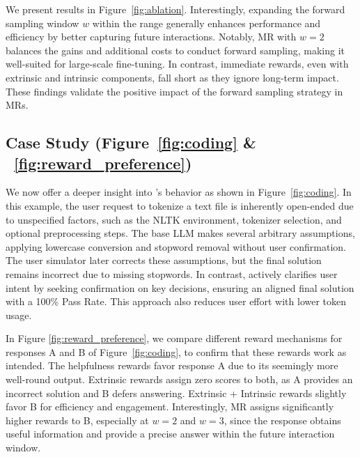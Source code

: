 


We present results in Figure~\ref{fig:ablation}.
Interestingly,
expanding the forward sampling window $w$ within the range generally enhances performance and efficiency by better capturing future interactions. Notably, MR with $w=2$ balances the gains and additional costs to conduct forward sampling, making it well-suited for large-scale fine-tuning. In contrast, immediate rewards, even with extrinsic and intrinsic components, fall short as they ignore long-term impact. 
These findings validate the positive impact of the forward sampling strategy in MRs.


\subsection{Case Study (Figure~\ref{fig:coding} \& ~\ref{fig:reward_preference})}
\label{sec:case}
We now offer a deeper insight into \name{}'s behavior as shown in Figure~\ref{fig:coding}. In this example,
the user request to tokenize a text file is inherently open-ended due to unspecified factors, such as the NLTK environment, tokenizer selection, and optional preprocessing steps. The base LLM makes several arbitrary assumptions, applying lowercase conversion and stopword removal without user confirmation. The user simulator later corrects these assumptions, but the final solution remains incorrect due to missing stopwords.
In contrast, \name{} actively clarifies user intent by seeking confirmation on key decisions, ensuring an aligned final solution with a 100\% Pass Rate. This approach also reduces user effort with lower token usage.

In Figure \ref{fig:reward_preference}, we compare different reward mechanisms for responses A and B of Figure~\ref{fig:coding}, to confirm that these rewards work as intended. The helpfulness rewards favor response A due to its seemingly more well-round output. Extrinsic rewards assign zero scores to both, as A provides an incorrect solution and B defers answering. Extrinsic + Intrinsic rewards slightly favor B for efficiency and engagement. Interestingly, MR assigns significantly higher rewards to B, especially at $w=2$ and $w=3$, since the response obtains useful information and provide a precise answer within the future interaction window.


